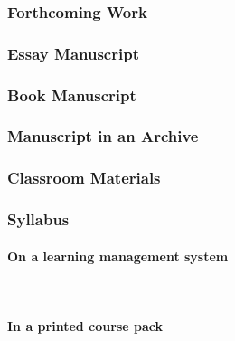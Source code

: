 \documentclass{ltxdockit}
\newcommand{\myparagraph}[1]{\paragraph{#1}\mbox{}\\}
\begin{document}
\subsubsection{Forthcoming Work} %
\label{sub:forthcoming_work}
\begin{refsection}
	\printbibliography[heading=none]
\end{refsection}
\subsubsection{Essay Manuscript} %
\label{sub:essay_manuscript}
\begin{refsection}
	\printbibliography[heading=none]
\end{refsection}
\subsubsection{Book Manuscript} %
\label{sub:book_manuscript}
\begin{refsection}
	\printbibliography[heading=none]
\end{refsection}
\subsubsection{Manuscript in an Archive} %
\label{sub:manuscript_in_an_archive}
\begin{refsection}
	\printbibliography[heading=none]
\end{refsection}
\subsubsection{Classroom Materials} %
\label{sub:classroom_materials}
\subsubsection{Syllabus} %
\label{sub:syllabus}
\begin{refsection}
	\printbibliography[heading=none]
\end{refsection}
\myparagraph{On a learning management system} %
\label{ssub:on_a_learning_management_system}
\begin{refsection}
	\printbibliography[heading=none]
\end{refsection}
\myparagraph{In a printed course pack} %
\label{ssub:in_a_printed_course_pack}
\begin{refsection}
	\printbibliography[heading=none]
\end{refsection}
\end{document}
